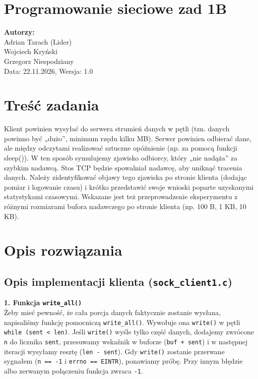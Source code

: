 \documentclass[12pt,a4paper]{article}
\begin{document}
\section*{Programowanie sieciowe zad 1B}

\textbf{Autorzy:} \\
Adrian Tarach (Lider) \\
Wojciech Kryński\\
Grzegorz Niespodziany \\
Data: 22.11.2026, Wersja: 1.0

\section*{Treść zadania}

Klient powinien wysyłać do serwera strumień danych w pętli (tzn. danych powinno być „dużo”, minimum rzędu kilku
MB). Serwer powinien odbierać dane, ale między odczytami realizować sztuczne opóźnienie (np. za pomocą funkcji
sleep()). W ten sposób symulujemy zjawisko odbiorcy, który „nie nadąża” za szybkim nadawcą. Stos TCP będzie
spowalniał nadawcę, aby uniknąć tracenia danych. Należy zidentyfikować objawy tego zjawiska po stronie klienta
(dodając pomiar i logowanie czasu) i krótko przedstawić swoje wnioski poparte uzyskanymi statystykami czasowymi.
Wskazane jest też przeprowadzenie eksperymentu z różnymi rozmiarami bufora nadawczego po stronie klienta (np. 100
B, 1 KB, 10 KB).


\section*{Opis rozwiązania}

\subsection*{Opis implementacji klienta (\texttt{sock\_client1.c})}

\textbf{1. Funkcja \texttt{write\_all()}} \\
Żeby mieć pewność, że cała porcja danych faktycznie zostanie wysłana, napisaliśmy funkcję pomocniczą \texttt{write\_all()}. Wywołuje ona \texttt{write()} w pętli \texttt{while (sent < len)}. Jeśli \texttt{write()} wyśle tylko część danych, dodajemy zwrócone \texttt{n} do licznika \texttt{sent}, przesuwamy wskaźnik w buforze (\texttt{buf + sent}) i w następnej iteracji wysyłamy resztę (\texttt{len - sent}). Gdy \texttt{write()} zostanie przerwane sygnałem (\texttt{n == -1} i \texttt{errno == EINTR}), ponawiamy próbę. Przy innym błędzie albo zerwanym połączeniu funkcja zwraca \texttt{-1}.
\end{document}
